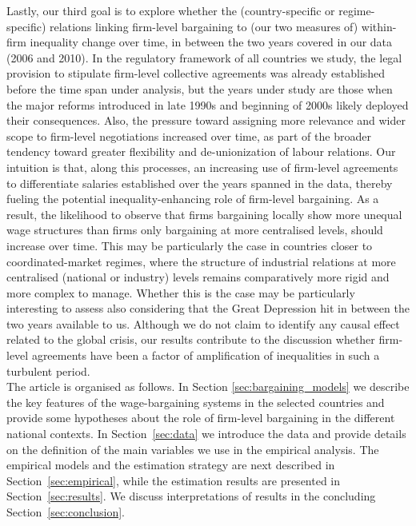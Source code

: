 \documentclass[12pt]{article}
\begin{document}
Lastly, our third goal is to explore whether the (country-specific or
regime-specific) relations linking firm-level bargaining to (our two
measures of) within-firm inequality change over time, in between the
two years covered in our data (2006 and 2010). In the regulatory
framework of all countries we study, the legal provision to stipulate
firm-level collective agreements was already established before the
time span under analysis, but the years under study are those when the
major reforms introduced in late 1990s and beginning of 2000s likely
deployed their consequences. Also, the pressure toward assigning more
relevance and wider scope to firm-level negotiations increased over
time, as part of the broader tendency toward greater flexibility and
de-unionization of labour relations. Our intuition is that, along this
processes, an increasing use of firm-level agreements to differentiate
salaries established over the years spanned in the data, thereby
fueling the potential inequality-enhancing role of firm-level
bargaining. As a result, the likelihood to observe that firms
bargaining locally show more unequal wage structures than firms only
bargaining at more centralised levels, should increase over time. This
may be particularly the case in countries closer to coordinated-market
regimes, where the structure of industrial relations at more
centralised (national or industry) levels remains comparatively more
rigid and more complex to manage.  Whether this is the case may be
particularly interesting to assess also considering that the Great
Depression hit in between the two years available to us. Although we
do not claim to identify any causal effect related to the global
crisis, our results contribute to the discussion whether firm-level
agreements have been a
factor of amplification of inequalities in such a turbulent period.\\


The article is organised as follows. In Section
\ref{sec:bargaining_models} we describe the key features of the
wage-bargaining systems in the selected countries and provide some
hypotheses about the role of firm-level bargaining in the different
national contexts. In Section~\ref{sec:data} we introduce the data and
provide details on the definition of the main variables we use in the
empirical analysis. The empirical models and the estimation strategy
are next described in Section~\ref{sec:empirical}, while the
estimation results are presented in Section~\ref{sec:results}. We
discuss interpretations of results in the concluding
Section~\ref{sec:conclusion}.
\end{document}
